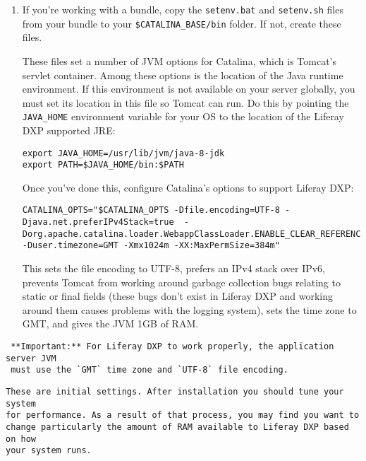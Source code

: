 \begin{enumerate}
\def\labelenumi{\arabic{enumi}.}
\item
  If you're working with a bundle, copy the \texttt{setenv.bat} and
  \texttt{setenv.sh} files from your bundle to your
  \texttt{\$CATALINA\_BASE/bin} folder. If not, create these files.

  These files set a number of JVM options for Catalina, which is
  Tomcat's servlet container. Among these options is the location of the
  Java runtime environment. If this environment is not available on your
  server globally, you must set its location in this file so Tomcat can
  run. Do this by pointing the \texttt{JAVA\_HOME} environment variable
  for your OS to the location of the Liferay DXP supported JRE:

\begin{verbatim}
export JAVA_HOME=/usr/lib/jvm/java-8-jdk
export PATH=$JAVA_HOME/bin:$PATH
\end{verbatim}

  Once you've done this, configure Catalina's options to support Liferay
  DXP:

\begin{verbatim}
CATALINA_OPTS="$CATALINA_OPTS -Dfile.encoding=UTF-8 -Djava.net.preferIPv4Stack=true  -Dorg.apache.catalina.loader.WebappClassLoader.ENABLE_CLEAR_REFERENCES=false -Duser.timezone=GMT -Xmx1024m -XX:MaxPermSize=384m" 
\end{verbatim}

  This sets the file encoding to UTF-8, prefers an IPv4 stack over IPv6,
  prevents Tomcat from working around garbage collection bugs relating
  to static or final fields (these bugs don't exist in Liferay DXP and
  working around them causes problems with the logging system), sets the
  time zone to GMT, and gives the JVM 1GB of RAM.
\end{enumerate}

\noindent\hrulefill

\begin{verbatim}
 **Important:** For Liferay DXP to work properly, the application server JVM
 must use the `GMT` time zone and `UTF-8` file encoding.
\end{verbatim}

\noindent\hrulefill

\begin{verbatim}
These are initial settings. After installation you should tune your system
for performance. As a result of that process, you may find you want to
change particularly the amount of RAM available to Liferay DXP based on how
your system runs. 
\end{verbatim}


